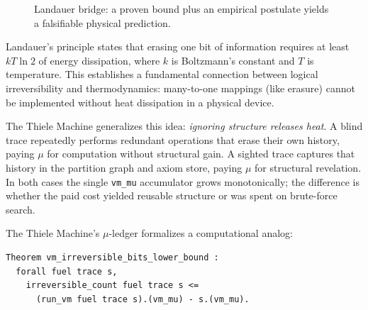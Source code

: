 \begin{figure}[h]
\centering
{}
\caption{Landauer bridge: a proven bound plus an empirical postulate yields a falsifiable physical prediction.}
\label{fig:landauer-bridge}
\end{figure}

Landauer's principle states that erasing one bit of information requires at least $kT \ln 2$ of energy dissipation, where $k$ is Boltzmann's constant and $T$ is temperature. This establishes a fundamental connection between logical irreversibility and thermodynamics: many-to-one mappings (like erasure) cannot be implemented without heat dissipation in a physical device.

The Thiele Machine generalizes this idea: \textit{ignoring structure releases heat}. A blind trace repeatedly performs redundant operations that erase their own history, paying $\mu$ for computation without structural gain. A sighted trace captures that history in the partition graph and axiom store, paying $\mu$ for structural revelation. In both cases the single \texttt{vm\_mu} accumulator grows monotonically; the difference is whether the paid cost yielded reusable structure or was spent on brute-force search.

The Thiele Machine's $\mu$-ledger formalizes a computational analog:
\begin{lstlisting}
Theorem vm_irreversible_bits_lower_bound :
  forall fuel trace s,
    irreversible_count fuel trace s <=
      (run_vm fuel trace s).(vm_mu) - s.(vm_mu).
\end{lstlisting}

